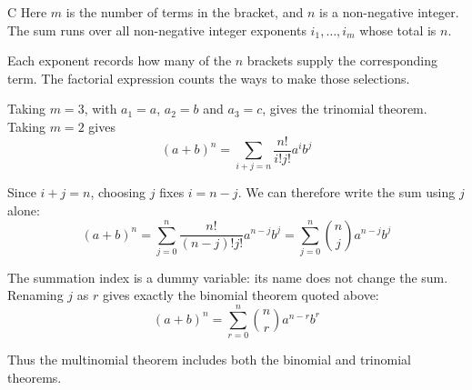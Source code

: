 \documentclass[11pt,a4paper]{article}
\begin{document}
\begin{enumerate}[label=\textbf{\arabic*.},leftmargin=*,itemsep=0pt,start=11]
\begin{djsSolution}{C}
Here $m$ is the number of terms in the bracket, and $n$ is a non-negative integer. The sum runs over all non-negative integer exponents $i_1,\ldots,i_m$ whose total is $n$.

Each exponent records how many of the $n$ brackets supply the corresponding term. The factorial expression counts the ways to make those selections.

Taking $m=3$, with $a_1=a$, $a_2=b$ and $a_3=c$, gives the trinomial theorem. Taking $m=2$ gives
\[
(a+b)^n=\sum_{i+j=n}\frac{n!}{i!j!}a^ib^j
\]

Since $i+j=n$, choosing $j$ fixes $i=n-j$. We can therefore write the sum using $j$ alone:
\[
(a+b)^n
=\sum_{j=0}^{n}\frac{n!}{(n-j)!j!}a^{n-j}b^j
=\sum_{j=0}^{n}\binom nj a^{n-j}b^j
\]

The summation index is a dummy variable: its name does not change the sum. Renaming $j$ as $r$ gives exactly the binomial theorem quoted above:
\[
(a+b)^n=\sum_{r=0}^{n}\binom nr a^{n-r}b^r
\]

Thus the multinomial theorem includes both the binomial and trinomial theorems.
\end{djsSolution}
\end{enumerate}
\clearpage
\thispagestyle{djssolutions}
\vspace*{8pt}
\end{document}
